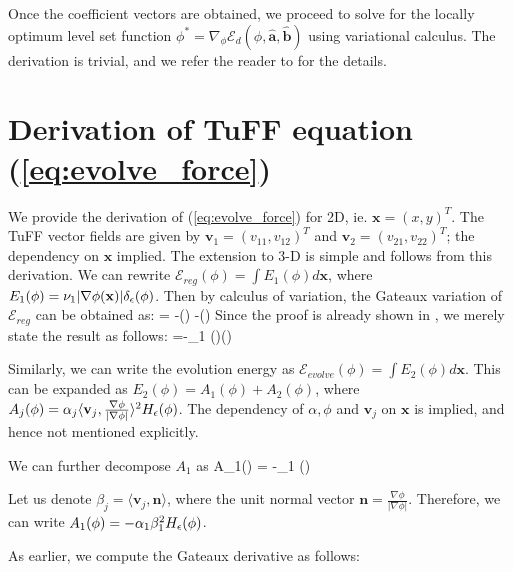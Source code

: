 Once the coefficient vectors are obtained, we proceed to solve for the locally optimum level set function $\phi^* = \nabla_\phi \mathcal{E}_d(\phi,\hat{\textbf{a}},\hat{\textbf{b}})$ using variational calculus. The derivation is trivial, and we refer the reader to \cite{chan_vese} for the details.

\section{Derivation of TuFF equation (\ref{eq:evolve_force})}
We provide the derivation of (\ref{eq:evolve_force}) for 2D, ie. $\textbf{x}=\left(x,y\right)^T$. The TuFF vector fields are given by $\textbf{v}_1=(v_{11},v_{12})^T$ and $\textbf{v}_2=(v_{21},v_{22})^T$; the dependency on $\textbf{x}$ implied.  The extension to 3-D is simple and follows from this derivation. We can rewrite $\mathcal{E}_{reg}(\phi)=\int E_1(\phi)d\textbf{x}$, where $E_1(\phi)=\nu_1|\nabla\phi(\textbf{\textbf{x}})|\delta_{\epsilon}(\phi)$. Then by calculus of variation, the Gateaux  variation of $\mathcal{E}_{reg}$ can be obtained as:
\bea
{}= -\left(\right)
-\left(\right)
\label{app:1}
\eea
Since the proof is already shown in \cite{chan_vese}, we merely state the result as follows:
\bea
{}=-\nu_1  \left(\frac{\nabla \phi}{|\nabla \phi|}\right)\dirac(\phi) 
\eea



Similarly, we can write the evolution energy as $\mathcal{E}_{evolve}(\phi)=\int E_2(\phi)d\textbf{x}$. This can be expanded as $E_2(\phi)=A_1(\phi)+ A_2(\phi)$, where $A_j(\phi)=\alpha_j \langle \textbf{v}_j,\frac{\nabla \phi}{|\nabla \phi|}\rangle ^2H_{\epsilon}(\phi)$. The dependency of $\alpha,\phi$ and $\textbf{v}_j$ on $\textbf{x}$ is implied, and hence not mentioned explicitly.


We can further decompose $A_1$ as
\bean
A_1(\phi) = -\alpha_1 \heav(\phi)
\eean

Let us denote $\beta_j=\langle \textbf{v}_j,\textbf{n}\rangle$, where the unit normal vector $\textbf{n}=\frac{\nabla \phi}{|\nabla \phi|}$. Therefore, we can write $A_1(\phi)=-\alpha_1 \beta_1^2 H_{\epsilon}(\phi)$.

As earlier, we compute the Gateaux derivative as follows:

